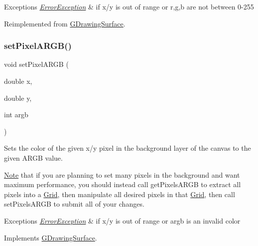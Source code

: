 \begin{DoxyExceptions}{Exceptions}
{\em \mbox{\hyperlink{classErrorException}{Error\+Exception}}} & if x/y is out of range or r,g,b are not between 0-\/255 \\
\hline
\end{DoxyExceptions}


Reimplemented from \mbox{\hyperlink{classGDrawingSurface_aec90e927c9da286214908d3f9da685d7}{G\+Drawing\+Surface}}.

\mbox{\label{classGCanvas_a366f5f71f21ad732fd2e2fdf624f0953}} 
\subsubsection{\texorpdfstring{set\+Pixel\+A\+R\+G\+B()}{setPixelARGB()}\hspace{0.1cm}{\footnotesize\ttfamily [1/2]}}
{\footnotesize\ttfamily void set\+Pixel\+A\+R\+GB (\begin{DoxyParamCaption}\item[{double}]{x,  }\item[{double}]{y,  }\item[{int}]{argb }\end{DoxyParamCaption})\hspace{0.3cm}{\ttfamily [virtual]}}



Sets the color of the given x/y pixel in the background layer of the canvas to the given A\+R\+GB value. 

\mbox{\hyperlink{classNote}{Note}} that if you are planning to set many pixels in the background and want maximum performance, you should instead call get\+Pixels\+A\+R\+GB to extract all pixels into a \mbox{\hyperlink{classGrid}{Grid}}, then manipulate all desired pixels in that \mbox{\hyperlink{classGrid}{Grid}}, then call set\+Pixels\+A\+R\+GB to submit all of your changes.


\begin{DoxyExceptions}{Exceptions}
{\em \mbox{\hyperlink{classErrorException}{Error\+Exception}}} & if x/y is out of range or argb is an invalid color \\
\hline
\end{DoxyExceptions}


Implements \mbox{\hyperlink{classGDrawingSurface_ab2f7c5a9462f552ad3f30d23c04605dd}{G\+Drawing\+Surface}}.

